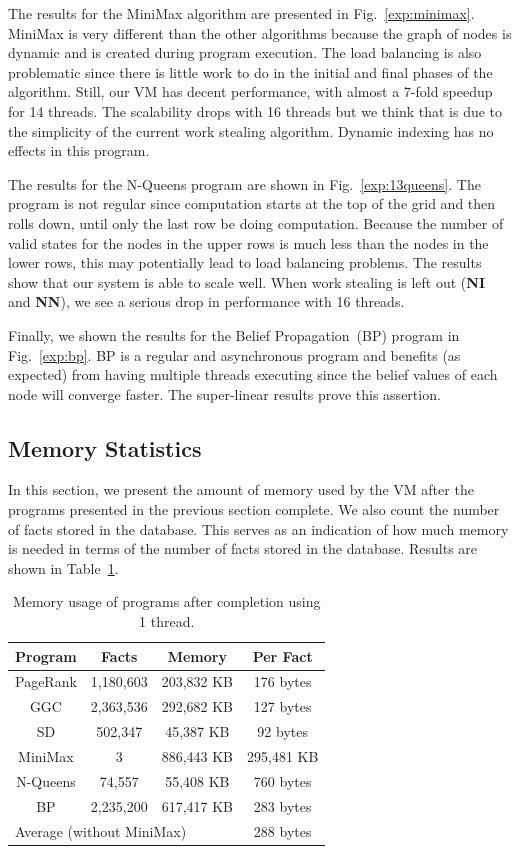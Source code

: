 \documentclass{sigplanconf}
\begin{document}
The results for the MiniMax algorithm are presented in Fig.~\ref{exp:minimax}.
MiniMax is very different than the other algorithms because the graph of nodes is dynamic
and is created during program execution. The load balancing is also problematic since there
is little work to do in the initial and final phases of the algorithm. Still, our VM has decent
performance, with almost a 7-fold speedup for 14 threads. The scalability drops with 16 threads
but we think that is due to the simplicity of the current work stealing algorithm.
Dynamic indexing has no effects in this program.

The results for the N-Queens program are shown in
Fig.~\ref{exp:13queens}. The program is not regular since computation
starts at the top of the grid and then rolls down, until only the last
row be doing computation. Because the number of valid states for the
nodes in the upper rows is much less than the nodes in the lower rows,
this may potentially lead to load balancing problems. The results show
that our system is able to scale well. When work stealing is left out
(\textbf{NI} and \textbf{NN}), we see a serious drop in performance with 16 threads.

Finally, we shown the results for the Belief Propagation~(BP) program
in Fig.~\ref{exp:bp}. BP is a regular and asynchronous program and
benefits (as expected) from having multiple threads executing since
the belief values of each node will converge faster.  The super-linear
results prove this assertion.

\subsection{Memory Statistics}

In this section, we present the amount of memory used by the VM after the
programs presented in the previous section complete. We also count the number of
facts stored in the database. This serves as an indication of
how much memory is needed in terms of the number of facts stored in the database.
Results are shown in Table~\ref{tbl:memory}.

\begin{table}[ht]
\centering
{\begin{tabular}{c|c|c|c}
\textbf{Program} & \textbf{Facts} & \textbf{Memory} & \textbf{Per Fact} \\
\hline\hline
PageRank & 1,180,603 & 203,832 KB & 176 bytes \\
GGC & 2,363,536 & 292,682 KB & 127 bytes \\
SD & 502,347 & 45,387 KB & 92 bytes \\
MiniMax & 3 & 886,443 KB & 295,481 KB \\
N-Queens & 74,557 & 55,408 KB & 760 bytes \\
BP & 2,235,200 & 617,417 KB & 283 bytes \\
\hline\hline
\multicolumn{3}{l}{Average (without MiniMax) } & 288 bytes \\
\end{tabular}}
\caption{Memory usage of programs after completion using 1 thread.}
\label{tbl:memory}
\end{table}
\end{document}
